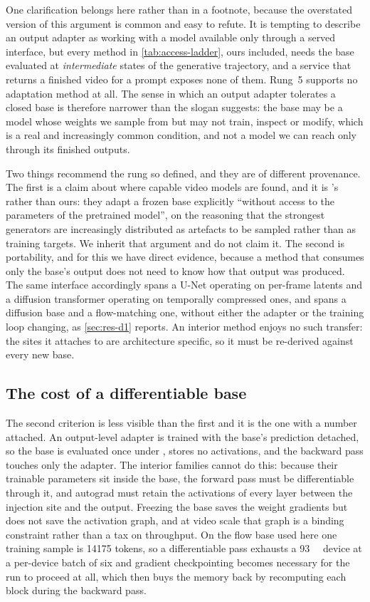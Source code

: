 One clarification belongs here rather than in a footnote, because the
overstated version of this argument is common and easy to refute. It is
tempting to describe an output adapter as working with a model available
only through a served interface, but every method in
\cref{tab:access-ladder}, ours included, needs the base evaluated at
\emph{intermediate} states of the generative trajectory, and a service that
returns a finished video for a prompt exposes none of them. Rung~5 supports
no adaptation method at all. The sense in which an output adapter tolerates
a closed base is therefore narrower than the slogan suggests: the base may
be a model whose weights we sample from but may not train, inspect or
modify, which is a real and increasingly common condition, and not a model
we can reach only through its finished outputs.

Two things recommend the rung so defined, and they are of different
provenance. The first is a claim about where capable video models are
found, and it is \citeauthor{rigter2024avid}'s rather than ours: they adapt
a frozen base explicitly ``without access to the parameters of the
pretrained model'', on the reasoning that the strongest generators are
increasingly distributed as artefacts to be sampled rather than as training
targets. We inherit that argument and do not claim it. The second is
portability, and for this we have direct evidence, because a method that
consumes only the base's output does not need to know how that output was
produced. The same interface accordingly spans a U-Net operating on
per-frame latents and a diffusion transformer operating on temporally
compressed ones, and spans a diffusion base and a flow-matching one,
without either the adapter or the training loop changing, as
\cref{sec:res-d1} reports. An interior method enjoys no such transfer: the
sites it attaches to are architecture specific, so it must be re-derived
against every new base.

\subsection{The cost of a differentiable base}
\label{sec:differentiable-cost}

The second criterion is less visible than the first and it is the one with
a number attached. An output-level adapter is trained with the base's
prediction detached, so the base is evaluated once under ,
stores no activations, and the backward pass touches only the adapter. The
interior families cannot do this: because their trainable parameters sit
inside the base, the forward pass must be differentiable through it, and
autograd must retain the activations of every layer between the injection
site and the output. Freezing the base saves the weight gradients but does
not save the activation graph, and at video scale that graph is a binding
constraint rather than a tax on throughput. On the flow base used here one
training sample is \num{14175} tokens, so a differentiable pass exhausts a
\SI{93}{\giga\byte} device at a per-device batch of six and gradient
checkpointing becomes necessary for the run to proceed at all, which then
buys the memory back by recomputing each block during the backward pass.

